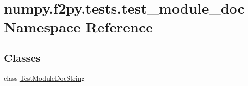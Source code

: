 \hypertarget{namespacenumpy_1_1f2py_1_1tests_1_1test__module__doc}{}\section{numpy.\+f2py.\+tests.\+test\+\_\+module\+\_\+doc Namespace Reference}
\label{namespacenumpy_1_1f2py_1_1tests_1_1test__module__doc}
\subsection*{Classes}
\begin{DoxyCompactItemize}
\item 
class \hyperlink{classnumpy_1_1f2py_1_1tests_1_1test__module__doc_1_1TestModuleDocString}{Test\+Module\+Doc\+String}
\end{DoxyCompactItemize}
